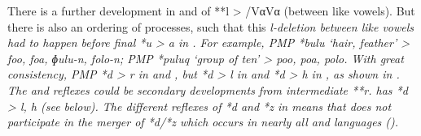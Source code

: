 There is a further development in 
and  of **l > {\0} /Vα{\gap}Vα (between like vowels).
But there is also an ordering of processes,
such that this \it{l}-deletion between like vowels had to happen
before final *u > \it{a} in .
For example, PMP *bulu ‘hair, feather’ >  \it{foo},
 \it{foa},  \it{ɸulu-n},
 \it{folo-n}; PMP *puluq ‘group of ten’ >  \it{poo},
 \it{poa},  \it{polo}.
With great consistency, PMP *d > \it{r} in 
and , but *d > \it{l} in 
and *d > \it{h} in ,
as shown in .
The  and  reflexes could be secondary developments from intermediate **r.
 has *d > \it{l,
h} (see  below).
The different reflexes of *d
and *z in  means that 
does not participate in the merger of *d/*z which occurs in nearly
all  and 
languages ().

